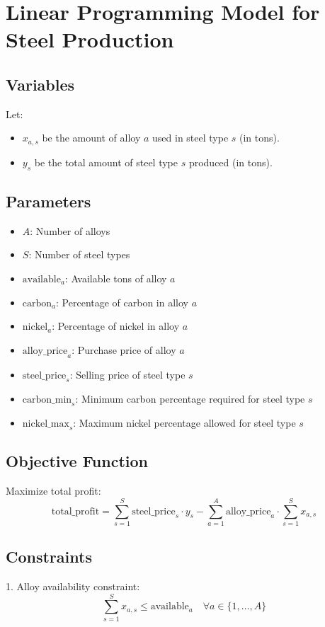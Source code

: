 \documentclass{article}
\begin{document}
\section*{Linear Programming Model for Steel Production}

\subsection*{Variables}
Let:
\begin{itemize}
    \item \( x_{a,s} \) be the amount of alloy \( a \) used in steel type \( s \) (in tons).
    \item \( y_s \) be the total amount of steel type \( s \) produced (in tons).
\end{itemize}

\subsection*{Parameters}
\begin{itemize}
    \item \( A \): Number of alloys
    \item \( S \): Number of steel types
    \item \( \text{available}_a \): Available tons of alloy \( a \)
    \item \( \text{carbon}_{a} \): Percentage of carbon in alloy \( a \)
    \item \( \text{nickel}_{a} \): Percentage of nickel in alloy \( a \)
    \item \( \text{alloy\_price}_{a} \): Purchase price of alloy \( a \)
    \item \( \text{steel\_price}_{s} \): Selling price of steel type \( s \)
    \item \( \text{carbon\_min}_{s} \): Minimum carbon percentage required for steel type \( s \)
    \item \( \text{nickel\_max}_{s} \): Maximum nickel percentage allowed for steel type \( s \)
\end{itemize}

\subsection*{Objective Function}
Maximize total profit:
\[
\text{total\_profit} = \sum_{s=1}^{S} \text{steel\_price}_s \cdot y_s - \sum_{a=1}^{A} \text{alloy\_price}_a \cdot \sum_{s=1}^{S} x_{a,s}
\]

\subsection*{Constraints}
1. Alloy availability constraint:
\[
\sum_{s=1}^{S} x_{a,s} \leq \text{available}_a \quad \forall a \in \{1, \ldots, A\}
\]
\end{document}
